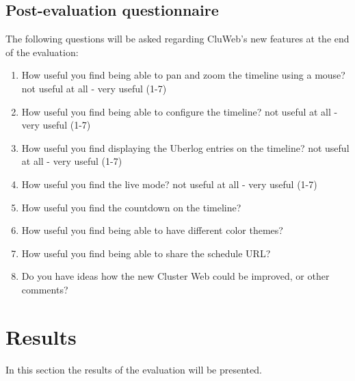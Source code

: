 \subsection{Post-evaluation questionnaire} \label{post-evaluation}
The following questions will be asked regarding CluWeb's new features at the end of the evaluation:
\begin{enumerate}
\item How useful you find being able to pan and zoom the timeline using a mouse? not useful at all - very useful (1-7)
\item How useful you find being able to configure the timeline? not useful at all - very useful (1-7)
\item How useful you find displaying the Uberlog entries on the timeline? not useful at all - very useful (1-7)
\item How useful you find the live mode? not useful at all - very useful (1-7)
\item How useful you find the countdown on the timeline?
\item How useful you find being able to have different color themes?
\item How useful you find being able to share the schedule URL?
\item Do you have ideas how the new Cluster Web could be improved, or other comments?
\end{enumerate}

\section{Results}
In this section the results of the evaluation will be presented.


\cite{bevanevaluation, rubin2008handbook, albert2013measuring}